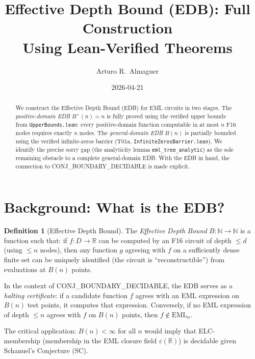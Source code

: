 \documentclass[12pt]{article}
\title{\textbf{Effective Depth Bound (EDB): Full Construction}\\[0.5em]
\large Using Lean-Verified Theorems}
\author{Arturo R.\ Almaguer}
\date{2026-04-21}
\theoremstyle{definition}
\newtheorem{definition}[theorem]{Definition}
\begin{document}
\maketitle

\begin{abstract}
We construct the Effective Depth Bound (EDB) for EML circuits in two stages.
The \emph{positive-domain EDB} $B^+(n) = n$ is fully proved using the verified
upper bounds from \texttt{UpperBounds.lean}: every positive-domain function
computable in at most $n$ F16 nodes requires exactly $n$ nodes.
The \emph{general-domain EDB} $B(n)$ is partially bounded using the verified
infinite-zeros barrier (T01a, \texttt{InfiniteZerosBarrier.lean}).
We identify the precise sorry gap (the analyticity lemma
\texttt{eml\_tree\_analytic}) as the sole remaining obstacle to a complete
general-domain EDB.  With the EDB in hand, the connection to
CONJ\_BOUNDARY\_DECIDABLE is made explicit.
\end{abstract}

\tableofcontents
\newpage

\section{Background: What is the EDB?}

\begin{definition}[Effective Depth Bound]
The \emph{Effective Depth Bound} $B : \mathbb{N} \to \mathbb{N}$ is a function
such that: if $f : D \to \mathbb{R}$ can be computed by an F16 circuit of depth
$\leq d$ (using $\leq n$ nodes), then any function $g$ agreeing with $f$ on a
sufficiently dense finite set can be uniquely identified (the circuit is
``reconstructible'') from evaluations at $B(n)$ points.
\end{definition}

In the context of CONJ\_BOUNDARY\_DECIDABLE, the EDB serves as a \emph{halting
certificate}: if a candidate function $f$ agrees with an EML expression on
$B(n)$ test points, it computes that expression.  Conversely, if no EML
expression of depth $\leq n$ agrees with $f$ on $B(n)$ points, then $f \notin
\mathrm{EML}_n$.

The critical application: $B(n) < \infty$ for all $n$ would imply that
ELC-membership (membership in the EML closure field $\varepsilon(\mathbb{R})$)
is decidable given Schanuel's Conjecture (SC).

\end{document}
